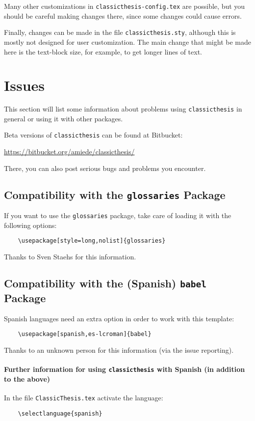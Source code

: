 Many other customizations in \texttt{classicthesis-config.tex} are
possible, but you should be careful making changes there, since some
changes could cause errors.

Finally, changes can be made in the file \texttt{classicthesis.sty},%
 although this is mostly not designed for user customization. The
main change that might be made here is the text-block size, for example,
to get longer lines of text.


\section{Issues}\label{sec:issues}
This section will list some information about problems using
\texttt{classic\-thesis} in general or using it with other packages.

Beta versions of \texttt{classicthesis} can be found at Bitbucket:
\begin{center}
    \url{https://bitbucket.org/amiede/classicthesis/}
\end{center}
There, you can also post serious bugs and problems you encounter.

\subsection*{Compatibility with the \texttt{glossaries} Package}
If you want to use the \texttt{glossaries} package, take care of loading it 
with the following options:
\begin{lstlisting}
    \usepackage[style=long,nolist]{glossaries}
\end{lstlisting}
Thanks to Sven Staehs for this information. 


\subsection*{Compatibility with the (Spanish) \texttt{babel} Package}
Spanish languages need an extra option in order to work with this template:
\begin{lstlisting}
    \usepackage[spanish,es-lcroman]{babel}
\end{lstlisting}
Thanks to an unknown person for this information (via the issue reporting). 


\paragraph{Further information for using \texttt{classicthesis} with Spanish (in addition to the above)}
In the file \texttt{ClassicThesis.tex} activate the language: 
\begin{lstlisting}
    \selectlanguage{spanish}
\end{lstlisting}
    
